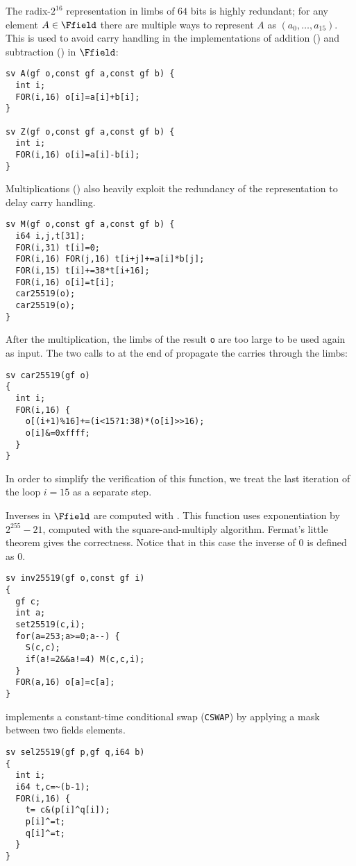 The radix-$2^{16}$ representation in limbs of $64$ bits is
highly redundant; for any element $A \in \Ffield$ there are
multiple ways to represent $A$ as $(a_0,\dots,a_{15})$.
This is used to avoid carry handling in the implementations of addition
() and subtraction () in $\Ffield$:
\begin{lstlisting}[language=Ctweetnacl]
sv A(gf o,const gf a,const gf b) {
  int i;
  FOR(i,16) o[i]=a[i]+b[i];
}

sv Z(gf o,const gf a,const gf b) {
  int i;
  FOR(i,16) o[i]=a[i]-b[i];
}
\end{lstlisting}

Multiplications () also heavily exploit the redundancy
of the representation to delay carry handling.
\begin{lstlisting}[language=Ctweetnacl]
sv M(gf o,const gf a,const gf b) {
  i64 i,j,t[31];
  FOR(i,31) t[i]=0;
  FOR(i,16) FOR(j,16) t[i+j]+=a[i]*b[j];
  FOR(i,15) t[i]+=38*t[i+16];
  FOR(i,16) o[i]=t[i];
  car25519(o);
  car25519(o);
}
\end{lstlisting}

After the multiplication, the limbs of the result \texttt{o} are
too large to be used again as input.
The two calls to
 at the end of  propagate the carries through the limbs:
\begin{lstlisting}[language=Ctweetnacl]
sv car25519(gf o)
{
  int i;
  FOR(i,16) {
    o[(i+1)%16]+=(i<15?1:38)*(o[i]>>16);
    o[i]&=0xffff;
  }
}
\end{lstlisting}

In order to simplify the verification of this function,
we treat the last iteration of the loop $i = 15$ as a separate step.

Inverses in $\Ffield$ are computed with .
This function uses exponentiation by $2^{255}-21$,
computed with the square-and-multiply algorithm.
Fermat's little theorem gives the correctness.
Notice that in this case the inverse of $0$ is defined as $0$.
\begin{lstlisting}[language=Ctweetnacl]
sv inv25519(gf o,const gf i)
{
  gf c;
  int a;
  set25519(c,i);
  for(a=253;a>=0;a--) {
    S(c,c);
    if(a!=2&&a!=4) M(c,c,i);
  }
  FOR(a,16) o[a]=c[a];
}
\end{lstlisting}

 implements a constant-time conditional swap (\texttt{CSWAP}) by
applying a mask between two fields elements.
\begin{lstlisting}[language=Ctweetnacl]
sv sel25519(gf p,gf q,i64 b)
{
  int i;
  i64 t,c=~(b-1);
  FOR(i,16) {
    t= c&(p[i]^q[i]);
    p[i]^=t;
    q[i]^=t;
  }
}
\end{lstlisting}

